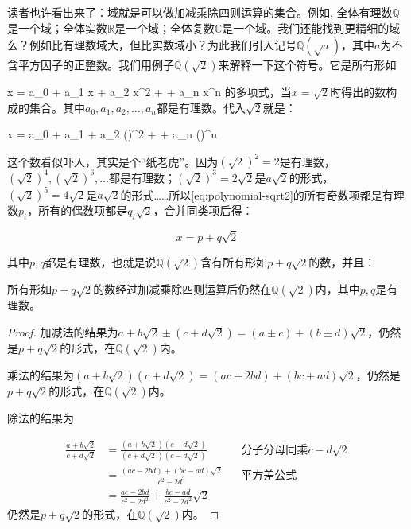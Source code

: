 读者也许看出来了：域就是可以做加减乘除四则运算的集合。例如, 全体有理数$\mathbb{Q}$是一个域；全体实数$\mathbb{R}$是一个域；全体复数$\mathbb{C}$是一个域。我们还能找到更精细的域么？例如比有理数域大，但比实数域小？为此我们引入记号$\mathbb{Q}(\sqrt{a})$，其中$a$为不含平方因子的正整数。我们用例子$\mathbb{Q}(\sqrt{2})$来解释一下这个符号。它是所有形如

\be
x = a_0 + a_1 x + a_2 x^2 + \dotsb + a_n x^n
\ee
的多项式，当$x = \sqrt{2}$时得出的数构成的集合。其中$a_0, a_1, a_2, \dotsc, a_n$都是有理数。代入$\sqrt{2}$就是：

\be
x = a_0 + a_1  + a_2 ()^2 + \dotsb + a_n ()^n
\label{eq:polynomial-sqrt2}
\ee

这个数看似吓人，其实是个“纸老虎”。因为$(\sqrt{2})^2 = 2$是有理数，$(\sqrt{2})^4, (\sqrt{2})^6, \dotsc$都是有理数；$(\sqrt{2})^3 = 2\sqrt{2}$是$a\sqrt{2}$的形式，$(\sqrt{2})^5 = 4\sqrt{2}$是$a\sqrt{2}$的形式……所以\cref{eq:polynomial-sqrt2}的所有奇数项都是有理数$p_i$，所有的偶数项都是$q_i\sqrt{2}$，合并同类项后得：

\[
x = p + q\sqrt{2}
\]

其中$p, q$都是有理数，也就是说$\mathbb{Q}(\sqrt{2})$含有所有形如$p + q\sqrt{2}$的数，并且：

\begin{proposition}
所有形如$p + q\sqrt{2}$的数经过加减乘除四则运算后仍然在$\mathbb{Q}(\sqrt{2})$内，其中$p, q$是有理数。
\end{proposition}

\begin{proof}
加减法的结果为$a + b\sqrt{2} \pm (c + d\sqrt{2}) = (a \pm c) + (b \pm d)\sqrt{2}$，仍然是$p + q\sqrt{2}$的形式，在$\mathbb{Q}(\sqrt{2})$内。

乘法的结果为$(a + b\sqrt{2})(c + d\sqrt{2}) = (ac + 2bd) + (bc + ad)\sqrt{2}$，仍然是$p + q\sqrt{2}$的形式，在$\mathbb{Q}(\sqrt{2})$内。

除法的结果为

\begin{align*}
\frac{a + b\sqrt{2}}{c + d\sqrt{2}} &= \frac{(a + b\sqrt{2})(c - d\sqrt{2})}{(c + d\sqrt{2})(c - d\sqrt{2})} &&\text{分子分母同乘}c - d\sqrt{2} \\
&= \frac{(ac - 2bd) + (bc - ad)\sqrt{2}}{c^2 - 2d^2} &&\text{平方差公式} \\
&= \frac{ac - 2bd}{c^2 - 2d^2} + \frac{bc - ad}{c^2 - 2d^2}\sqrt{2}
\end{align*}
仍然是$p + q\sqrt{2}$的形式，在$\mathbb{Q}(\sqrt{2})$内。
\end{proof}

